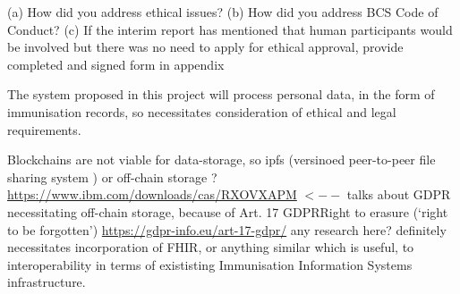  (a) How did you address ethical issues? \linebreak[1]
 (b) How did you address BCS Code of Conduct? \linebreak[1]
 (c) If the interim report has mentioned that human participants would be involved but there was no need to apply for ethical approval, provide completed and signed form in appendix


 The system proposed in this project will process personal data,
 in the form of immunisation records, so necessitates
 consideration of ethical and legal requirements.
 
 Blockchains are not viable for data-storage, so ipfs (versinoed peer-to-peer file sharing system %
     ) or off-chain storage ? \url{https://www.ibm.com/downloads/cas/RXOVXAPM} $<--$ talks about GDPR necessitating off-chain storage, because of Art. 17 GDPRRight to erasure (‘right to be forgotten’) \url{https://gdpr-info.eu/art-17-gdpr/}
 any research here? definitely necessitates incorporation of FHIR, or anything similar which is useful, to interoperability in terms of exististing Immunisation Information Systems infrastructure. %
 
